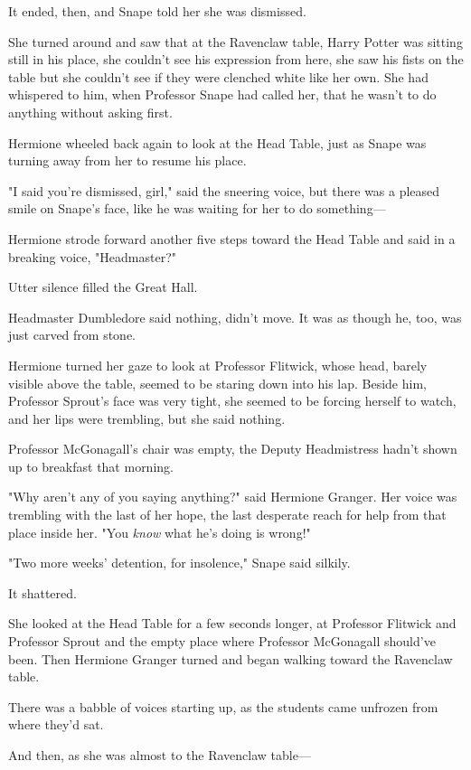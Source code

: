 It ended, then, and Snape told her she was dismissed.

She turned around and saw that at the Ravenclaw table, Harry Potter was sitting
still in his place, she couldn't see his expression from here, she saw his
fists on the table but she couldn't see if they were clenched white like her
own. She had whispered to him, when Professor Snape had called her, that he
wasn't to do anything without asking first.

Hermione wheeled back again to look at the Head Table, just as Snape was
turning away from her to resume his place.

"I said you're dismissed, girl," said the sneering voice, but there was a
pleased smile on Snape's face, like he was waiting for her to do something---

Hermione strode forward another five steps toward the Head Table and said in a
breaking voice, "Headmaster?"

Utter silence filled the Great Hall.

Headmaster Dumbledore said nothing, didn't move. It was as though he, too, was
just carved from stone.

Hermione turned her gaze to look at Professor Flitwick, whose head, barely
visible above the table, seemed to be staring down into his lap. Beside him,
Professor Sprout's face was very tight, she seemed to be forcing herself to
watch, and her lips were trembling, but she said nothing.

Professor McGonagall's chair was empty, the Deputy Headmistress hadn't shown up
to breakfast that morning.

"Why aren't any of you saying anything?" said Hermione Granger. Her voice was
trembling with the last of her hope, the last desperate reach for help from
that place inside her. "You \emph{know} what he's doing is wrong!"

"Two more weeks' detention, for insolence," Snape said silkily.

It shattered.

She looked at the Head Table for a few seconds longer, at Professor Flitwick
and Professor Sprout and the empty place where Professor McGonagall should've
been. Then Hermione Granger turned and began walking toward the Ravenclaw table.

There was a babble of voices starting up, as the students came unfrozen from
where they'd sat.

And then, as she was almost to the Ravenclaw table---

